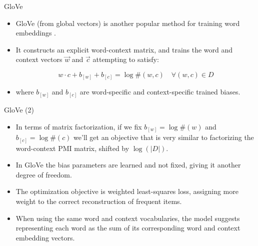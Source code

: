 \begin{frame}{GloVe}
\begin{scriptsize}
\begin{itemize}
\item  GloVe (from global vectors) is another popular method for training word embeddings \cite{penningtonSM14}.

\item It constructs an explicit word-context
matrix, and trains the word and context vectors $\vec{w}$ and $\vec{c}$ attempting to satisfy:

\begin{equation}
w \cdot c + b_{[w]}+b_{[c]} = \log \#(w,c) \quad \forall (w,c) \in D
\end{equation}

\item where $b_{[w]}$ and $b_{[c]}$ are word-specific and context-specific trained biases.

        
\end{itemize}
\end{scriptsize}
\end{frame}



\begin{frame}{GloVe (2)}
\begin{scriptsize}
\begin{itemize}

\item In terms of matrix factorization, if we fix $b_{[w]}=\log \#(w)$ and $b_{[c]}=\log \#(c)$ we'll get an objective that is very similar to factorizing the word-context PMI matrix, shifted by $\log (|D|)$.
\item In GloVe the bias parameters are learned and not fixed, giving it another degree of freedom.

\item The optimization objective is weighted least-squares loss, assigning more weight to the correct reconstruction of frequent items.
       
\item When using the same word and context vocabularies, the model suggests representing each word as the sum of its corresponding word and context embedding vectors.   
        
\end{itemize}
\end{scriptsize}
\end{frame}


